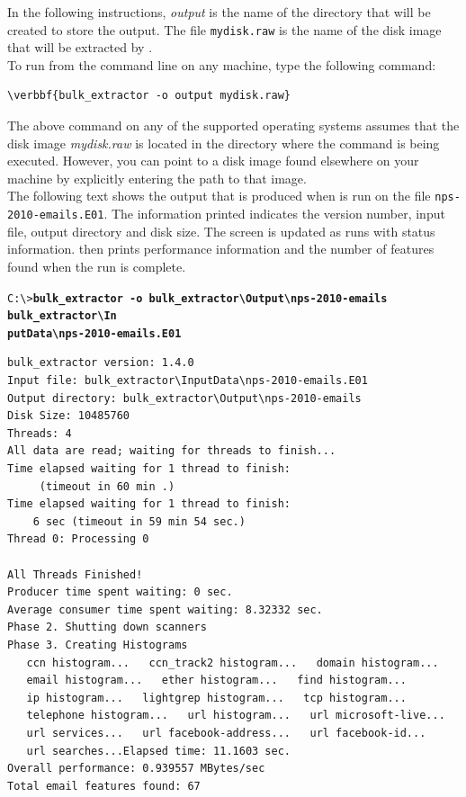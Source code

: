 \documentclass[11pt]{article} %
\begin{document}
In the following instructions, \textit{output} is the name of the directory that will be created to store the \bulk output. The file \texttt{mydisk.raw} is the name of the disk image that will be extracted by \bulk. \\

To run \bulk from the command line on any machine, type the following command:
\begin{Verbatim}[commandchars=\\\{\}]
\verbbf{bulk_extractor -o output mydisk.raw}
\end{Verbatim}

The above command on any of the supported operating systems assumes that the disk image \textit{mydisk.raw} is located in the directory where the command is being executed. However, you can point \bulk to a disk image found elsewhere on your machine by explicitly entering the path to that image.\\

The following text shows the output that is produced when \bulk is run on the file \texttt{nps-2010-emails.E01}. The information printed indicates the version number, input file, output directory and disk size. The screen is updated as \bulk runs  with status information. \bulk then prints performance information and the number of features found when the run is complete.

\begingroup
\footnotesize
\texttt{C:\textbackslash \textgreater \textbf{bulk\_extractor -o bulk\_extractor\textbackslash Output\textbackslash nps-2010-emails bulk\_extractor\textbackslash In\\putData\textbackslash nps-2010-emails.E01}}
\endgroup
\begingroup
\footnotesize
\begin{Verbatim}[fontfamily=courier]
bulk_extractor version: 1.4.0
Input file: bulk_extractor\InputData\nps-2010-emails.E01
Output directory: bulk_extractor\Output\nps-2010-emails
Disk Size: 10485760
Threads: 4
All data are read; waiting for threads to finish...
Time elapsed waiting for 1 thread to finish:
     (timeout in 60 min .)
Time elapsed waiting for 1 thread to finish:
    6 sec (timeout in 59 min 54 sec.)
Thread 0: Processing 0

All Threads Finished!
Producer time spent waiting: 0 sec.
Average consumer time spent waiting: 8.32332 sec.
Phase 2. Shutting down scanners
Phase 3. Creating Histograms
   ccn histogram...   ccn_track2 histogram...   domain histogram...
   email histogram...   ether histogram...   find histogram...
   ip histogram...   lightgrep histogram...   tcp histogram...
   telephone histogram...   url histogram...   url microsoft-live...
   url services...   url facebook-address...   url facebook-id...
   url searches...Elapsed time: 11.1603 sec.
Overall performance: 0.939557 MBytes/sec
Total email features found: 67
\end{Verbatim}
\endgroup
\end{document}
